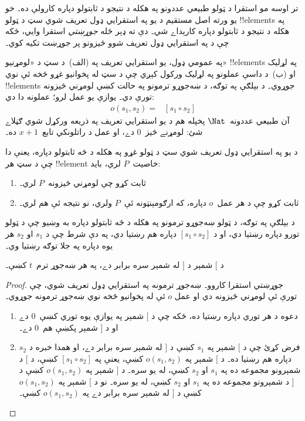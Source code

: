 \documentclass[../../../include/open-logic-section]{subfiles}
\begin{document}


تر اوسه مو استقرا د ټولو طبيعي عددونو په هکله د
نتيجو د ثابتولو دپاره کارولې ده۔ خو يو ورته اصل
مستقيم د يو په استقرايي ډول تعريف شوي سټ د ټولو
!!{element}s په هکله د نتيجو د ثابتولو دپاره
کارېداے شي۔ دې ته ډېر ځله \emph{جوړښتي} استقرا
وايي، ځکه چې د په استقرايي ډول تعريف شوو څيزونو
پر جوړښت تکيه کوي۔

په عمومي ډول، يو استقرايي تعريف په (الف)~د سټ د
«لومړنيو» !!{element}s په لړليک او (ب)~د داسې عملونو
په لړليک ورکول کېږي چې د سټ له پخوانيو غړو
څخه ئې نوي !!{element}s جوړوي۔ د بېلګې په توګه، د
ښه‌جوړو ترمونو په حالت کښې لومړني څيزونه تورې دي۔
يوازې يو عمل لرو؛ عملونه دا دي:
\begin{align*}
  o(s_1, s_2) = & [s_1 \circ s_2]
\end{align*}
آن طبيعي عددونه~$\Nat$ پخپله هم د يو استقرايي
تعريف په ذريعه ورکړل شوي ګڼلاے شئ: لومړنے څيز~$0$
دے، او عمل د راتلونکي تابع~$x + 1$ ده۔

د يو په استقرايي ډول تعريف شوي سټ د ټولو غړو په
هکله د څه ثابتولو دپاره، يعنې دا چې د سټ هر
!!{element} خاصيت~$P$ لري، بايد:
\begin{enumerate}
\item ثابت کړو چې لومړني څيزونه~$P$ لري۔
\item ثابت کړو چې د هر عمل~$o$ دپاره، که ارګومېنټونه
  ئې~$P$ ولري، نو نتيجه ئې هم لري۔
\end{enumerate}
د بېلګې په توګه، د ټولو ښه‌جوړو ترمونو په هکله
د څه ثابتولو دپاره به وښيو چې د ټولو تورو دپاره
رښتيا دي، او د $[s_1 \circ s_2]$ دپاره هم رښتيا
دي، په دې شرط چې د $s_1$ او $s_2$ هر يوه دپاره
په جلا توګه رښتيا وي۔

\begin{prop}
د $[$ شمېر د $]$ له شمېر سره برابر دے، په هر
ښه‌جوړ ترم~$t$ کښې۔
\end{prop}

\begin{proof}
جوړښتي استقرا کاروو۔ ښه‌جوړ ترمونه په استقرايي
ډول تعريف شوي، چې تورې ئې لومړني څيزونه دي او
عمل $o$ ئې له پخوانيو څخه نوي ښه‌جوړ ترمونه جوړوي۔
\begin{enumerate}
\item دعوه د هر توري دپاره رښتيا ده، ځکه چې د $[$
  شمېر په يوازې يوه توري کښې~$0$ دے او د $]$ شمېر
  پکښې هم~$0$ دے۔
\item فرض کړئ چې د $[$ شمېر په $s_1$ کښې د $]$
  له شمېر سره برابر دے، او همدا خبره د $s_2$
  دپاره هم رښتيا ده۔ د $[$ شمېر په $o(s_1, s_2)$
  کښې، يعنې په $[s_1 \circ s_2]$ کښې، د $[$ د
  شمېرونو مجموعه ده په $s_1$ او $s_2$ کښې، له
  يو سره۔ د $]$ شمېر په $o(s_1, s_2)$ کښې د $]$
  د شمېرونو مجموعه ده په $s_1$ او $s_2$ کښې، له
  يو سره۔ نو د $[$ شمېر په $o(s_1, s_2)$ کښې د
  $]$ له شمېر سره برابر دے په $o(s_1,s_2)$ کښې۔
\end{enumerate}
\end{proof}
\end{document}

